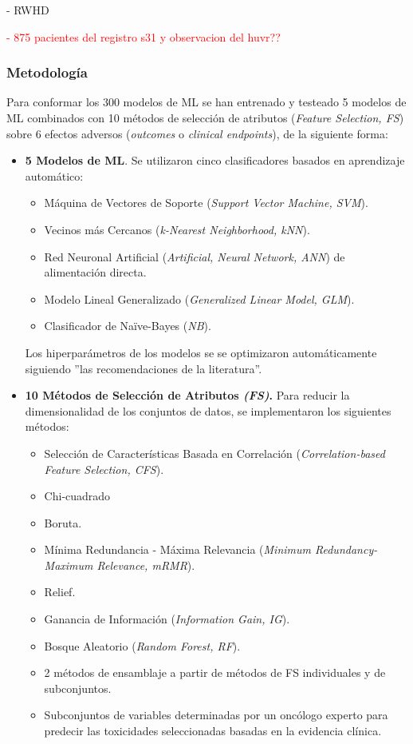 - RWHD

\textcolor{red}{- 875 pacientes del registro s31 y observacion del huvr??}

\subsubsection{Metodología}

Para conformar los 300 modelos de ML se han entrenado y testeado 5 modelos de ML combinados con 10 métodos de selección de atributos (\textit{Feature Selection, FS}) sobre 6 efectos adversos (\textit{outcomes} o \textit{clinical endpoints}), de la siguiente forma: 

\begin{itemize}
    \item \textbf{5 Modelos de ML}. Se utilizaron cinco clasificadores basados en aprendizaje 
    automático: 
    \begin{itemize}[label={--}]
        \item Máquina de Vectores de Soporte (\textit{Support Vector Machine, SVM}).
        \item Vecinos más Cercanos (\textit{k-Nearest Neighborhood, kNN}).
        \item Red Neuronal Artificial (\textit{Artificial, Neural Network, ANN}) de alimentación directa.
        \item Modelo Lineal Generalizado (\textit{Generalized Linear Model, GLM}).
        \item Clasificador de Naïve-Bayes (\textit{NB}).
    \end{itemize}
     Los hiperparámetros de los modelos se se optimizaron automáticamente siguiendo ''las recomendaciones de la literatura''.
    
    \item \textbf{10 Métodos de Selección de Atributos \textit{(FS)}.} Para reducir la dimensionalidad de los conjuntos de datos, se implementaron los siguientes métodos:
    
    \begin{itemize}[label={--}]
        \item Selección de Características Basada en Correlación (\textit{Correlation-based Feature Selection, CFS}).
        \item Chi-cuadrado %
        \item Boruta.
        \item Mínima Redundancia - Máxima Relevancia (\textit{Minimum Redundancy-Maximum Relevance, mRMR}).
        \item Relief.
        \item Ganancia de Información (\textit{Information Gain, IG}).
        \item  Bosque Aleatorio (\textit{Random Forest, RF}).
        \item 2 métodos de ensamblaje a partir de métodos de FS individuales y de subconjuntos.
        \item Subconjuntos de variables determinadas por un oncólogo experto para predecir las toxicidades seleccionadas basadas en la evidencia clínica.
    \end{itemize}


\end{itemize}
